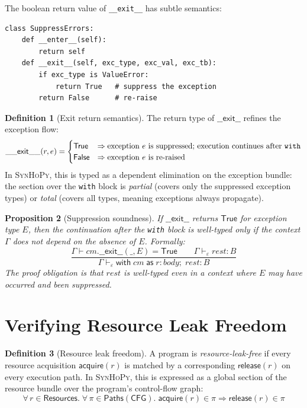 \documentclass[11pt,a4paper]{report}
\theoremstyle{definition}
\newtheorem{definition}{Definition}[chapter]
\theoremstyle{plain}
\newtheorem{proposition}[definition]{Proposition}
\newcommand{\synhopy}{\textsc{SynHoPy}}
\begin{document}
The boolean return value of \lstinline[style=python]{__exit__} has
subtle semantics:

\begin{lstlisting}[style=python]
class SuppressErrors:
    def __enter__(self):
        return self
    def __exit__(self, exc_type, exc_val, exc_tb):
        if exc_type is ValueError:
            return True   # suppress the exception
        return False      # re-raise
\end{lstlisting}

\begin{definition}[Exit return semantics]
The return type of $\mathsf{\_\_exit\_\_}$ refines the exception flow:
\[
  \mathsf{\_\_exit\_\_}(r, e) = \begin{cases}
    \mathsf{True} & \Rightarrow \text{exception $e$ is suppressed;
      execution continues after \texttt{with}} \\
    \mathsf{False} & \Rightarrow \text{exception $e$ is re-raised}
  \end{cases}
\]
In \synhopy{}, this is typed as a dependent elimination on the
exception bundle: the section over the \texttt{with} block is
\emph{partial} (covers only the suppressed exception types) or
\emph{total} (covers all types, meaning exceptions always propagate).
\end{definition}

\begin{proposition}[Suppression soundness]
If $\mathsf{\_\_exit\_\_}$ returns $\mathsf{True}$ for exception type $E$,
then the continuation after the \texttt{with} block is well-typed only if
the context $\Gamma$ does not depend on the absence of $E$.  Formally:
\[
  \frac{
    \Gamma \vdash \mathit{cm}.\mathsf{\_\_exit\_\_}(\_, E) = \mathsf{True} \qquad
    \Gamma \vdash_\varepsilon \mathit{rest} : B
  }{
    \Gamma \vdash_{\varepsilon} \mathsf{with}\;\mathit{cm}\;\mathsf{as}\;r\!:
      \mathit{body};\; \mathit{rest} : B
  }
\]
The proof obligation is that $\mathit{rest}$ is well-typed even in a context
where $E$ may have occurred and been suppressed.
\end{proposition}

\section{Verifying Resource Leak Freedom}

\begin{definition}[Resource leak freedom]
A program is \emph{resource-leak-free} if every resource acquisition
$\mathsf{acquire}(r)$ is matched by a corresponding
$\mathsf{release}(r)$ on every execution path.  In \synhopy{}, this
is expressed as a global section of the resource bundle over the
program's control-flow graph:
\[
  \forall\, r \in \mathsf{Resources}.\;
    \forall\, \pi \in \mathsf{Paths}(\mathsf{CFG}).\;
      \mathsf{acquire}(r) \in \pi \Rightarrow \mathsf{release}(r) \in \pi
\]
\end{definition}
\end{document}
